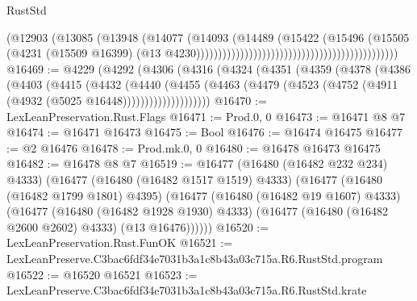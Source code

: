 \begin{lexlean}{RustStd}
\begin{coremodule}
                                                                          (@12903
                                                                            (@13085
                                                                              (@13948
                                                                                (@14077
                                                                                  (@14093
                                                                                    (@14489
                                                                                      (@15422
                                                                                        (@15496
                                                                                          (@15505
                                                                                            (@4231
                                                                                              (@15509
                                                                                                @16399)
                                                                                              (@13
                                                                                                @4230))))))))))))))))))))))))))))))))))))))))))))))
@16469 := @4229
    (@4292
      (@4306
        (@4316
          (@4324
            (@4351
              (@4359
                (@4378
                  (@4386
                    (@4403
                      (@4415
                        (@4432
                          (@4440
                            (@4455
                              (@4463
                                (@4479 (@4523 (@4752 (@4911 (@4932 (@5025 @16448))))))))))))))))))))
@16470 := LexLeanPreservation.Rust.Flags
@16471 := Prod.{0, 0}
@16473 := @16471 @8 @7
@16474 := @16471 @16473
@16475 := Bool
@16476 := @16474 @16475
@16477 := @2 @16476
@16478 := Prod.mk.{0, 0}
@16480 := @16478 @16473 @16475
@16482 := @16478 @8 @7
@16519 := @16477
    (@16480 (@16482 @232 @234) @4333)
    (@16477
      (@16480 (@16482 @1517 @1519) @4333)
      (@16477
        (@16480 (@16482 @1799 @1801) @4395)
        (@16477
          (@16480 (@16482 @19 @1607) @4333)
          (@16477
            (@16480 (@16482 @1928 @1930) @4333)
            (@16477 (@16480 (@16482 @2600 @2602) @4333) (@13 @16476))))))
@16520 := LexLeanPreservation.Rust.FunOK
@16521 := LexLeanPreserve.C3bac6fdf34e7031b3a1c8b43a03c715a.R6.RustStd.program
@16522 := @16520 @16521
@16523 := LexLeanPreserve.C3bac6fdf34e7031b3a1c8b43a03c715a.R6.RustStd.krate

\end{coremodule}
\end{lexlean}
